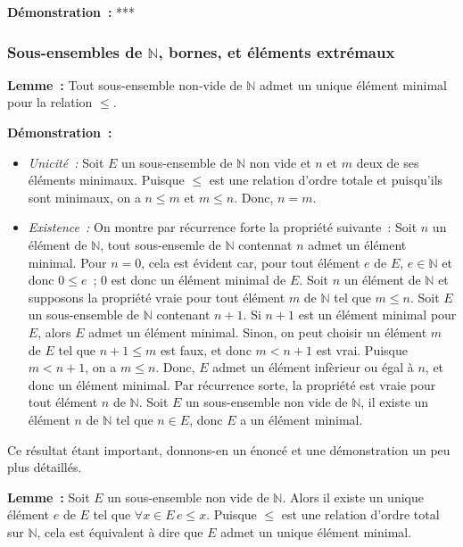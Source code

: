     \done

\noindent\textbf{Démonstration :} ***

\subsubsection{Sous-ensembles de \texorpdfstring{$\mathbb{N}$}{N}, bornes, et éléments extrémaux}

\noindent\textbf{Lemme :} Tout sous-ensemble non-vide de $\mathbb{N}$ admet un unique élément minimal pour la relation $\leq$.

\medskip

\noindent\textbf{Démonstration :} 
\begin{itemize}[nosep]
    \item \textit{Unicité :} Soit $E$ un sous-ensemble de $\mathbb{N}$ non vide et $n$ et $m$ deux de ses éléments minimaux. 
        Puisque $\leq$ est une relation d'ordre totale et puisqu'ils sont minimaux, on a $n \leq m$ et $m \leq n$. 
        Donc, $n = m$.
    \item \textit{Existence :} On montre par récurrence forte la propriété suivante : Soit $n$ un élément de $\mathbb{N}$, tout sous-ensemle de $\mathbb{N}$ contennat $n$ admet un élément minimal.
        Pour $n=0$, cela est évident car, pour tout élément $e$ de $E$, $e \in \mathbb{N}$ et donc $0 \leq e$ ; $0$ est donc un élément minimal de $E$.
        Soit $n$ un élément de $\mathbb{N}$ et supposons la propriété vraie pour tout élément $m$ de $\mathbb{N}$ tel que $m \leq n$.
        Soit $E$ un sous-ensemble de $\mathbb{N}$ contenant $n+1$.
        Si $n+1$ est un élément minimal pour $E$, alors $E$ admet un élément minimal. 
        Sinon, on peut choisir un élément $m$ de $E$ tel que $n+1 \leq m$ est faux, et donc $m < n+1$ est vrai.
        Puisque $m < n+1$, on a $m \leq n$.
        Donc, $E$ admet un élément infèrieur ou égal à $n$, et donc un élément minimal.
        Par récurrence sorte, la propriété est vraie pour tout élément $n$ de $\mathbb{N}$.
        Soit $E$ un sous-ensemble non vide de $\mathbb{N}$, il existe un élément $n$ de $\mathbb{N}$ tel que $n \in E$, donc $E$ a un élément minimal. 
\end{itemize} 

\done

\medskip

Ce résultat étant important, donnons-en un énoncé et une démonstration un peu plus détaillés.

\medskip

\noindent\textbf{Lemme :} Soit $E$ un sous-ensemble non vide de $\mathbb{N}$. 
    Alors il existe un unique élément $e$ de $E$ tel que $\forall x \in E \, e \leq x$. 
    Puisque $\leq$ est une relation d'ordre total sur $\mathbb{N}$, cela est équivalent à dire que $E$ admet un unique élément minimal. 

